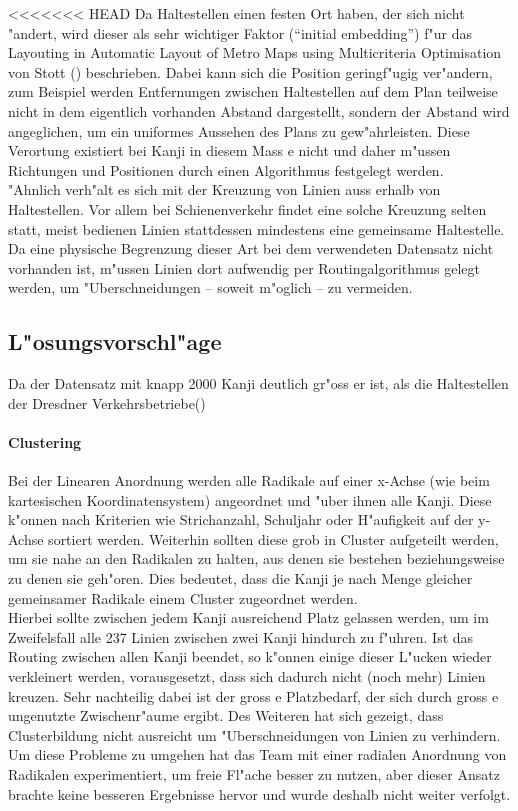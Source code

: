 <<<<<<< HEAD
Da Haltestellen einen festen Ort haben, der sich nicht "andert, wird dieser als sehr wichtiger Faktor ("`initial embedding"') f"ur das Layouting in Automatic Layout of Metro Maps using Multicriteria Optimisation von Stott (\cite{automaticlayoutmetro08}) beschrieben. Dabei kann sich die Position geringf"ugig ver"andern, zum Beispiel werden Entfernungen zwischen Haltestellen auf dem Plan teilweise nicht in dem eigentlich vorhanden Abstand dargestellt, sondern der Abstand wird angeglichen, um ein uniformes Aussehen des Plans zu gew"ahrleisten. Diese Verortung existiert bei Kanji in diesem Mass e nicht und daher m"ussen Richtungen und Positionen durch einen Algorithmus festgelegt werden. \\
"Ahnlich verh"alt es sich mit der Kreuzung von Linien auss erhalb von Haltestellen. Vor allem bei Schienenverkehr findet eine solche Kreuzung selten statt, meist bedienen Linien stattdessen mindestens eine gemeinsame Haltestelle. Da eine physische Begrenzung dieser Art bei dem verwendeten Datensatz nicht vorhanden ist, m"ussen Linien dort aufwendig per Routingalgorithmus gelegt werden, um "Uberschneidungen – soweit m"oglich – zu vermeiden.

\subsection{L"osungsvorschl"age}
Da der Datensatz mit knapp 2000 Kanji deutlich gr"oss er ist, als die Haltestellen der Dresdner Verkehrsbetriebe(\cite{dvbag})
\paragraph{Clustering}
Bei der Linearen Anordnung werden alle Radikale auf einer x-Achse (wie beim kartesischen Koordinatensystem) angeordnet und "uber ihnen alle Kanji. Diese k"onnen nach Kriterien wie Strichanzahl, Schuljahr oder H"aufigkeit auf der y-Achse sortiert werden. Weiterhin sollten diese grob in Cluster aufgeteilt werden, um sie nahe an den Radikalen zu halten, aus denen sie bestehen beziehungsweise zu denen sie geh"oren. Dies bedeutet, dass die Kanji je nach Menge gleicher gemeinsamer Radikale einem Cluster zugeordnet werden. \\
Hierbei sollte zwischen jedem Kanji ausreichend Platz gelassen werden, um im Zweifelsfall alle 237 Linien zwischen zwei Kanji hindurch zu f"uhren. Ist das Routing zwischen allen Kanji beendet, so k"onnen einige dieser L"ucken wieder verkleinert werden, vorausgesetzt, dass sich dadurch nicht (noch mehr) Linien kreuzen. 
Sehr nachteilig dabei ist der gross e Platzbedarf, der sich durch gross e ungenutzte Zwischenr"aume ergibt. Des Weiteren hat sich gezeigt, dass Clusterbildung nicht ausreicht um "Uberschneidungen von Linien zu verhindern. \\
Um diese Probleme zu umgehen hat das Team mit einer radialen Anordnung von Radikalen experimentiert, um freie Fl"ache besser zu nutzen, aber dieser Ansatz brachte keine besseren Ergebnisse hervor und wurde deshalb nicht weiter verfolgt.
